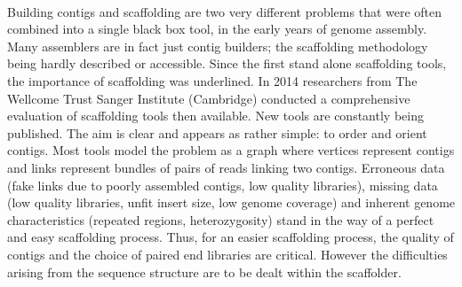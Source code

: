 \documentclass[11pt]{report}
\begin{document}
\begin{figure}[ht]
\end{figure}\\
Building contigs and scaffolding are two very different problems that were often combined into a single black box tool, in the early years of genome assembly. Many assemblers are in fact just contig builders; the scaffolding methodology being hardly described or accessible. Since the first stand alone scaffolding tools, the importance of scaffolding was underlined. In 2014 researchers from The Wellcome Trust Sanger Institute (Cambridge) conducted a comprehensive evaluation of scaffolding tools then available. New tools are constantly being published. The aim is clear and appears as rather simple: to order and orient contigs. Most tools model the problem as a graph where vertices represent contigs and links represent bundles of pairs of reads linking two contigs. Erroneous data (fake links due to poorly assembled contigs, low quality libraries), missing data (low quality libraries, unfit insert size, low genome coverage) and inherent genome characteristics (repeated regions,  heterozygosity) stand in the way of a perfect and easy scaffolding process. Thus, for an easier scaffolding process, the quality of contigs and the choice of paired end libraries are critical. However the difficulties arising from the sequence structure are to be dealt within the scaffolder.
\end{document}
